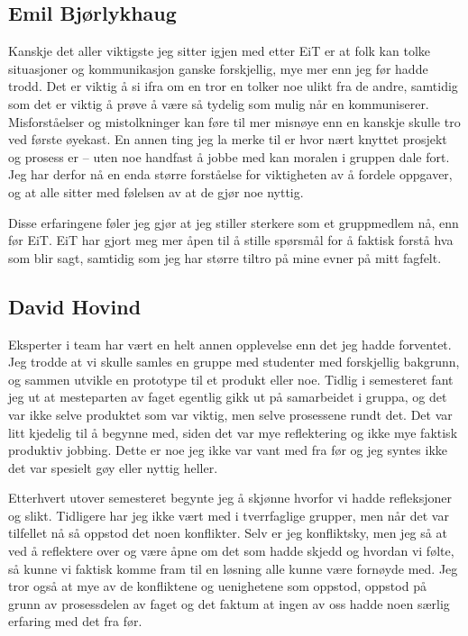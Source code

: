 \subsection*{Emil Bjørlykhaug}
Kanskje det aller viktigste jeg sitter igjen med etter EiT er at folk kan tolke situasjoner og kommunikasjon ganske forskjellig, mye mer enn jeg før hadde trodd. Det er viktig å si ifra om en tror en tolker noe ulikt fra de andre, samtidig som det er viktig å prøve å være så tydelig som mulig når en kommuniserer. Misforståelser og mistolkninger kan føre til mer misnøye enn en kanskje skulle tro ved første øyekast. En annen ting jeg la merke til er hvor nært knyttet prosjekt og prosess er – uten noe handfast å jobbe med kan moralen i gruppen dale fort. Jeg har derfor nå en enda større forståelse for viktigheten av å fordele oppgaver, og at alle sitter med følelsen av at de gjør noe nyttig.

Disse erfaringene føler jeg gjør at jeg stiller sterkere som et gruppmedlem nå, enn før EiT. EiT har gjort meg mer åpen til å stille spørsmål for å faktisk forstå hva som blir sagt, samtidig som jeg har større tiltro på mine evner på mitt fagfelt. 

\subsection*{David Hovind}
Eksperter i team har vært en helt annen opplevelse enn det jeg hadde forventet. 
Jeg trodde at vi skulle samles en gruppe med studenter med forskjellig bakgrunn, og sammen utvikle en prototype til et produkt eller noe. 
Tidlig i semesteret fant jeg ut at mesteparten av faget egentlig gikk ut på samarbeidet i gruppa, og det var ikke selve produktet som var viktig, men selve prosessene rundt det. 
Det var litt kjedelig til å begynne med, siden det var mye reflektering og ikke mye faktisk produktiv jobbing. 
Dette er noe jeg ikke var vant med fra før og jeg syntes ikke det var spesielt gøy eller nyttig heller.

Etterhvert utover semesteret begynte jeg å skjønne hvorfor vi hadde refleksjoner og slikt. 
Tidligere har jeg ikke vært med i tverrfaglige grupper, men når det var tilfellet nå så oppstod det noen konflikter. 
Selv er jeg konfliktsky, men jeg så at ved å reflektere over og være åpne om det som hadde skjedd og hvordan vi følte, så kunne vi faktisk komme fram til en løsning alle kunne være fornøyde med. 
Jeg tror også at mye av de konfliktene og uenighetene som oppstod, oppstod på grunn av prosessdelen av faget og det faktum at ingen av oss hadde noen særlig erfaring med det fra før. 

